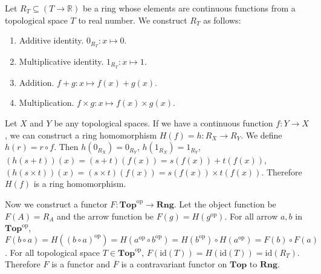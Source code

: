 \documentclass[luatex]{article}
\begin{document}
\subsubsection{}



\showArt

Let $R_T \subseteq (T \rightarrow \mathbb{R})$ be a ring whose elements are continuous functions from a topological space $T$ to real number. We construct $R_T$ as follows:

\begin{enumerate}
    \item Additive identity. $0_{R_T} : x \mapsto 0$.
    \item Multiplicative identity. $1_{R_T} : x \mapsto 1$.
    \item Addition. $f + g : x \mapsto f(x) + g(x)$.
    \item Multiplication. $f \times g : x \mapsto f(x) \times g(x)$.
\end{enumerate}

Let $X$ and $Y$ be any topological spaces. If we have a continuous function $f : Y \rightarrow X$, we can construct a ring homomorphism $H(f) = h : R_X \rightarrow R_Y$. We define $h(r) = r \circ f$. Then $h(0_{R_X}) = 0_{R_Y}$, $h(1_{R_X}) = 1_{R_Y}$, $(h(s + t))(x) = (s + t)(f(x)) = s(f(x)) + t(f(x))$, $(h(s \times t))(x) = (s \times t)(f(x)) = s(f(x)) \times t(f(x))$. Therefore $H(f)$ is a ring homomorphism.

Now we construct a functor $F : \mathbf{Top}^{\mathrm{op}} \rightarrow \mathbf{Rng}$. Let the object function be $F(A) = R_A$ and the arrow function be $F(g) = H(g^{\mathrm{op}})$. For all arrow $a, b$ in $\mathbf{Top}^{\mathrm{op}}$, $F(b \circ a) = H((b \circ a)^{\mathrm{op}}) = H(a^{\mathrm{op}} \circ b^{\mathrm{op}}) = H(b^{\mathrm{op}}) \circ H(a^{\mathrm{op}}) = F(b) \circ F(a)$. For all topological space $T \in \mathbf{Top}^{\mathrm{op}}$, $F(\mathrm{id}(T)) = H(\mathrm{id}(T)) = \mathrm{id}(R_T)$. Therefore $F$ is a functor and $\overline{F}$ is a contravariant functor on $\mathbf{Top}$ to $\mathbf{Rng}$.

\subsection{}

\subsubsection{}
\end{document}

